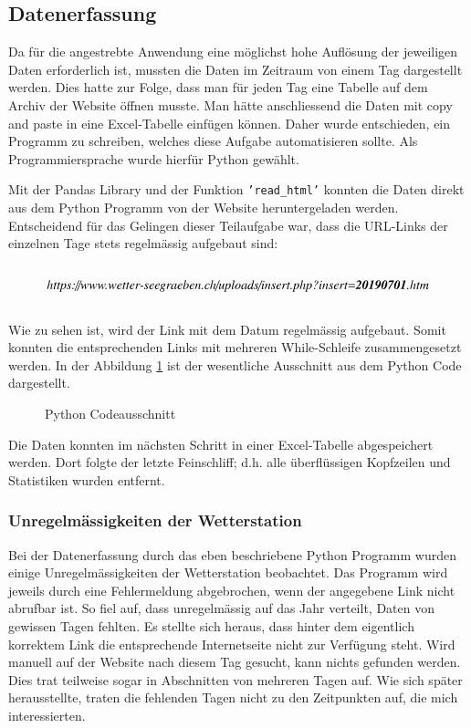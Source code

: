 \begin{refsection}
\subsection{Datenerfassung}
Da f\"ur die angestrebte Anwendung eine m\"oglichst hohe Aufl\"osung der jeweiligen Daten erforderlich ist, mussten die Daten im Zeitraum von einem Tag dargestellt werden.
Dies hatte zur Folge, dass man f\"ur jeden Tag eine Tabelle auf dem Archiv der Website \"offnen musste. Man hätte anschliessend die Daten mit copy and paste in eine Excel-Tabelle einf\"ugen können. Daher wurde  entschieden, ein Programm zu schreiben, welches diese Aufgabe automatisieren sollte.
Als Programmiersprache wurde hierf\"ur Python gewählt.


Mit der Pandas Library und der Funktion \texttt{'read\_html'} \space konnten die Daten direkt aus dem Python Programm von der Website heruntergeladen werden.
Entscheidend für das Gelingen dieser Teilaufgabe war, dass die URL-Links der einzelnen Tage stets regelmässig aufgebaut sind:
\\
\\
$$\centering{\textit{https://www.wetter-seegraeben.ch/uploads/insert.php?insert=\textbf{20190701}.htm}}$$
\\
Wie zu sehen ist, wird der Link mit dem Datum regelmässig aufgebaut. Somit konnten die entsprechenden Links mit mehreren While-Schleife zusammengesetzt werden.
In der Abbildung \ref{fig:python-code} ist der wesentliche Ausschnitt aus dem Python Code dargestellt.
\begin{figure}
	\centering
	
	\caption{Python Codeausschnitt}
	\label{fig:python-code}
\end{figure}
Die Daten konnten im nächsten Schritt in einer Excel-Tabelle abgespeichert werden.
Dort folgte der letzte Feinschliff; d.h. alle überflüssigen Kopfzeilen und Statistiken wurden entfernt.

\subsubsection{Unregelmässigkeiten der Wetterstation}
Bei der Datenerfassung durch das eben beschriebene Python Programm wurden einige Unregelmässigkeiten der Wetterstation beobachtet.
Das Programm wird jeweils durch eine Fehlermeldung abgebrochen, wenn der angegebene Link nicht abrufbar ist. 
So fiel auf, dass unregelmässig auf das Jahr verteilt, Daten von gewissen Tagen fehlten. Es stellte sich heraus, dass hinter dem eigentlich korrektem Link die entsprechende Internetseite nicht zur Verfügung steht.
Wird manuell auf der Website nach diesem Tag gesucht, kann nichts gefunden werden.
Dies trat teilweise sogar in Abschnitten von mehreren Tagen auf.
Wie sich später herausstellte, traten die fehlenden Tagen nicht zu den Zeitpunkten auf, die mich interessierten.



\end{refsection}
